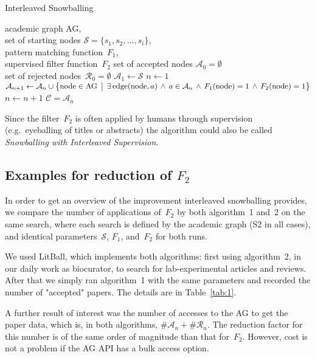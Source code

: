 \documentclass{article}
\begin{document}
\begin{algorithm}
\caption{Interleaved Snowballing}\label{alg:isn}
\begin{algorithmic}
\Require academic graph AG,\\ set of starting nodes $\mathcal{S}=\{s_1, s_2,\dots, s_i\}$,\\ pattern matching function~$F_1$,\\ supervised filter function~$F_2$
\State set of accepted nodes $\mathcal{A}_0 = \emptyset$\\ set of rejected nodes~$\mathcal{R}_0=\emptyset$
\State $\mathcal{A}_1 \gets \mathcal{S}$
\State $n \gets 1$
\State $\mathcal{A}_{n+1} \gets \mathcal{A}_n \cup \bigl\{\text{node} \in \text{AG}\,\bigm|\,\exists \,\text{edge}(\text{node},a) \,\wedge\, a\in\mathcal{A}_n \,\wedge\, F_1(\text{node})=1 \,\wedge\, F_2(\text{node})=1\bigr\} $
\State $n \gets n+1$
\EndWhile
\State $\mathcal{C} = \mathcal{A}_n$
\end{algorithmic}
\end{algorithm}

Since the filter~$F_2$ is often applied by humans through supervision (e.g.~eyeballing of titles or abstracts) the algorithm could also be called \textit{Snowballing with Interleaved Supervision}.

\subsection*{Examples for reduction of $F_2$}
In order to get an overview of the improvement interleaved snowballing provides, we compare the number of applications of~$F_2$ by both algorithm~1 and~2 on the same search, where each search is defined by the academic graph (S2\cite{Kinney2023TheSS} in all cases), and identical parameters~$\mathcal{S}$, $F_1$, and~$F_2$ for both runs.

We used LitBall, which implements both algorithms: first using algorithm~2, in our daily work as biocurator, to search for lab-experimental articles and reviews. After that we simply ran algorithm~1 with the same parameters and recorded the number of "accepted" papers. The details are in Table~\ref{tab:1}.

A further result of interest was the number of accesses to the AG to get the paper data, which is, in both algorithms, $\#\mathcal{A}_n + \#\mathcal{R}_n$. The reduction factor for this number is of the same order of magnitude than that for~$F_2$. However, cost is not a problem if the AG API has a bulk access option.
\end{document}
